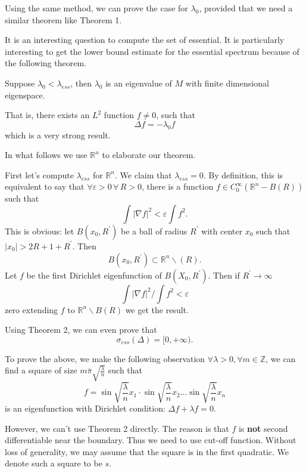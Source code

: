 Using the same method, we can prove the case for $ \lambda _0 $, provided that we need a similar theorem like 
Theorem 1.

It is an interesting question to compute the set of essential. It is particularly interesting to get the lower 
bound estimate for the essential spectrum because of the following theorem.

\begin{theorem}Suppose $ \lambda _0 < \lambda _{ess} $, then $ \lambda _ 0 $ is an eigenvalue of $M$ with finite dimensional eigenspace.

That is, there exists an $ L^2 $ function $ f \neq 0 $, such that 
%
\[ \Delta f = - \lambda _0 f \]
%
which is a very strong result.
\end{theorem}
In what follows we use $ \mathbb{R}^n $ to elaborate our theorem.

First let's compute $ \lambda _{ess} $ for $ \mathbb{R}^n $. We claim that $ \lambda _{ess} = 0 $. By definition, this is equivalent to say that $ \forall \varepsilon > 0  \, \forall \, R > 0 $, there is a function $ f \in C^\infty_0 ( \mathbb{R} ^n - B (R)) $ such that 
%
\[\int |\nabla f |^2 < \varepsilon \int f ^2.\]
%
This is obvious: let $ B (x_0, R ^\prime )$ be a ball of radius $R^\prime $ with center $ x _0 $ such that 
$ |x_0| >  2 R+ 1 + R^\prime $. Then
%
\[B(x_0, R^\prime ) \subset \mathbb{R}^n \backslash (R) .\]
%
Let $ f$ be the first Dirichlet eigenfunction of $ B (X_0, R^\prime )$.
Then if $ R^\prime \rightarrow \infty$ 
%
\[ \int |\nabla f |^2 /\int f ^2 < \varepsilon \]
%
zero extending $ f$ to $ \mathbb{R} ^n \backslash B(R) $ we get the result. 

Using Theorem 2, we can even prove that 
%
\[ \sigma _{ess} ( \Delta ) = [ 0, + \infty) .\]

To prove the above, we make the following observation $ \forall \lambda > 0 , \forall m \in \mathbb{Z} $, we can find a square of size $ m \bar{\pi} \sqrt{ \frac{\lambda }{n}} $ such that 
%
\[ f = \sin \sqrt{ \frac{\lambda }{n}} x _1 \cdot \sin \sqrt{ \frac{\lambda }{n}} x_2 \ldots \sin \sqrt{ \frac{\lambda }{n}} x_n \]
%
is an eigenfunction with Dirichlet condition: $ \Delta f + \lambda f = 0 $.

However, we can't use Theorem 2 directly. The reason is that $f$ is {\bf not} second differentiable near the boundary. Thus we need to use cut-off function. Without loss of generality, we may assume that the square is in the first quadratic. We denote such a square to be $s$.

